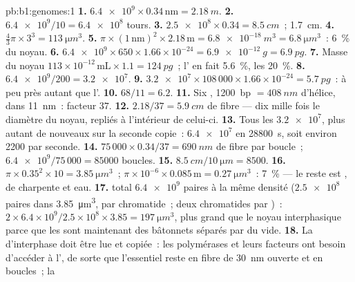 \begin{solution}{pb:b1:genomes:1}
\textbf{1.} $\num{6.4e9}\times 0.34\,\mathrm{nm} = \qty{2.18}{m}$.
\textbf{2.} $\num{6.4e9}/10 = \num{6.4e8}$ tours.
\textbf{3.} $\num{2.5e8}\times 0.34 = \qty{8.5}{cm}$~; \qty{1.7}{cm}.
\textbf{4.} $\frac{4}{3}\pi\times 3^3 = \qty{113}{\micro m^3}$.
\textbf{5.} $\pi\times(1\,\mathrm{nm})^2\times 2.18\,\mathrm{m} =
\qty{6.8e-18}{m^3} = \qty{6.8}{\micro m^3}$~: \qty{6}{\%} du noyau.
\textbf{6.} $\num{6.4e9}\times 650\times 1.66\times 10^{-24} =
\qty{6.9e-12}{g} = \qty{6.9}{pg}$.
\textbf{7.} Masse du noyau $113\times 10^{-12}\,\mathrm{mL}\times 1.1 =
\qty{124}{pg}$~; l' en fait \qty{5.6}{\%}, les  \qty{20}{\%}.
\textbf{8.} $\num{6.4e9}/200 = \num{3.2e7}$.
\textbf{9.} $\num{3.2e7}\times 108\,000\times 1.66\times 10^{-24} =
\qty{5.7}{pg}$~: à peu près autant que l'.
\textbf{10.} $68/11 = 6.2$.
\textbf{11.} Six , \qty{1200}{bp} $= \qty{408}{nm}$
d'hélice, dans \qty{11}{nm}~: facteur $37$.
\textbf{12.} $2.18/37 = \qty{5.9}{cm}$ de fibre --- dix mille fois le
diamètre du noyau, repliés à l'intérieur de celui-ci.
\textbf{13.} Tous les $\num{3.2e7}$, plus autant de nouveaux sur la
seconde copie~: $\num{6.4e7}$ en \qty{28800}{s}, soit environ
\num{2200} par seconde.
\textbf{14.} $75\,000\times 0.34/37 = \qty{690}{nm}$ de fibre par
boucle~; $\num{6.4e9}/75\,000 = \num{85000}$ boucles.
\textbf{15.} $\qty{8.5}{cm}/\qty{10}{\micro m} = 8500$.
\textbf{16.} $\pi\times 0.35^2\times 10 = \qty{3.85}{\micro m^3}$~; 
$\pi\times 10^{-6}\times 0.085\,\mathrm{m} = \qty{0.27}{\micro m^3}$~:
\qty{7}{\%} --- le reste est ,  de charpente et eau.
\textbf{17.}  total $\num{6.4e9}$ paires à la même densité
($\num{2.5e8}$ paires dans \qty{3.85}{\micro m^3}, par chromatide~; deux
chromatides par )~: $2\times 6.4\times 10^9/2.5\times 10^8\times
3.85 = \qty{197}{\micro m^3}$, plus grand que le noyau interphasique
parce que les  sont maintenant des bâtonnets séparés par du
vide.
\textbf{18.} La  d'interphase doit être lue et copiée~: les
polymérases et leurs facteurs ont besoin d'accéder à l', de sorte que
l'essentiel reste en fibre de \qty{30}{nm} ouverte et en boucles~; la

\end{solution}
